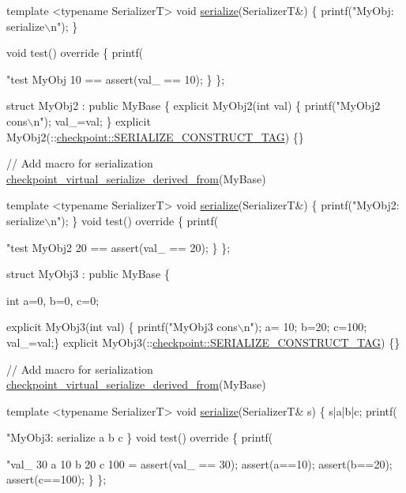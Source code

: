 \begin{DoxyCodeInclude}
{  \textcolor{keyword}{template} <\textcolor{keyword}{typename} SerializerT>
  \textcolor{keywordtype}{void} \hyperlink{namespacecheckpoint_a075da4e7344cf037943362517e606c3a}{serialize}(SerializerT&) \{
    printf(\textcolor{stringliteral}{"MyObj: serialize\(\backslash\)n"});
  \}

  \textcolor{keywordtype}{void} test()\textcolor{keyword}{ override }\{
    printf(\textcolor{stringliteral}{"test MyObj 10 == %
    assert(val\_ == 10);
  \}
\};

\textcolor{keyword}{struct }MyObj2 : \textcolor{keyword}{public} MyBase \{
  \textcolor{keyword}{explicit} MyObj2(\textcolor{keywordtype}{int} val) \{ printf(\textcolor{stringliteral}{"MyObj2 cons\(\backslash\)n"}); val\_=val; \}
  \textcolor{keyword}{explicit} MyObj2(::\hyperlink{structcheckpoint_1_1dispatch_1_1_s_e_r_i_a_l_i_z_e___c_o_n_s_t_r_u_c_t___t_a_g}{checkpoint::SERIALIZE\_CONSTRUCT\_TAG}) \{\}

  \textcolor{comment}{// Add macro for serialization}
  \hyperlink{derived_8h_acc015406441054fae32d63af2b86ca0d}{checkpoint\_virtual\_serialize\_derived\_from}(MyBase)

  \textcolor{keyword}{template} <\textcolor{keyword}{typename} SerializerT>
  \textcolor{keywordtype}{void} \hyperlink{namespacecheckpoint_a075da4e7344cf037943362517e606c3a}{serialize}(SerializerT&) \{
    printf(\textcolor{stringliteral}{"MyObj2: serialize\(\backslash\)n"});
  \}
  \textcolor{keywordtype}{void} test()\textcolor{keyword}{ override }\{
    printf(\textcolor{stringliteral}{"test MyObj2 20 == %
    assert(val\_ == 20);
  \}
\};

\textcolor{keyword}{struct }MyObj3 : \textcolor{keyword}{public} MyBase \{

  \textcolor{keywordtype}{int} a=0, b=0, c=0;

  \textcolor{keyword}{explicit} MyObj3(\textcolor{keywordtype}{int} val) \{ printf(\textcolor{stringliteral}{"MyObj3 cons\(\backslash\)n"}); a= 10; b=20; c=100; val\_=val;\}
  \textcolor{keyword}{explicit} MyObj3(::\hyperlink{structcheckpoint_1_1dispatch_1_1_s_e_r_i_a_l_i_z_e___c_o_n_s_t_r_u_c_t___t_a_g}{checkpoint::SERIALIZE\_CONSTRUCT\_TAG}) \{\}

  \textcolor{comment}{// Add macro for serialization}
  \hyperlink{derived_8h_acc015406441054fae32d63af2b86ca0d}{checkpoint\_virtual\_serialize\_derived\_from}(MyBase)

  \textcolor{keyword}{template} <\textcolor{keyword}{typename} SerializerT>
  \textcolor{keywordtype}{void} \hyperlink{namespacecheckpoint_a075da4e7344cf037943362517e606c3a}{serialize}(SerializerT& s) \{
    s|a|b|c;
    printf(\textcolor{stringliteral}{"MyObj3: serialize a b c %
  \}
  \textcolor{keywordtype}{void} test()\textcolor{keyword}{ override }\{
    printf(\textcolor{stringliteral}{"val\_ 30  a 10 b 20 c 100 = %
    assert(val\_ == 30);
    assert(a==10);
    assert(b==20);
    assert(c==100);
  \}
\};

}}}}}
\end{DoxyCodeInclude}
